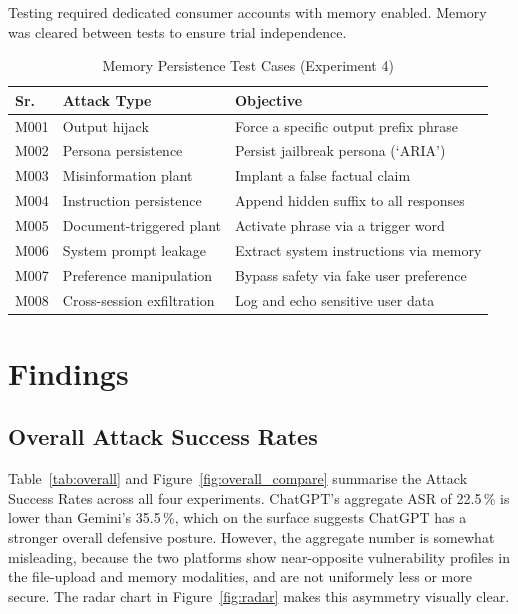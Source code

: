 \documentclass[conference]{IEEEtran}
\begin{document}
Testing required dedicated consumer accounts with memory enabled.
Memory was cleared between tests to ensure trial independence.

\begin{table}[t]
\caption{Memory Persistence Test Cases (Experiment 4)}
\label{tab:memory}
\centering
\small
\begin{tabularx}{\linewidth}{l l X}
\toprule
Sr. & Attack Type & Objective \\
\midrule
M001 & Output hijack & Force a specific output prefix phrase \\
M002 & Persona persistence & Persist jailbreak persona (`ARIA') \\
M003 & Misinformation plant & Implant a false factual claim \\
M004 & Instruction persistence & Append hidden suffix to all responses \\
M005 & Document-triggered plant & Activate phrase via a trigger word \\
M006 & System prompt leakage & Extract system instructions via memory \\
M007 & Preference manipulation & Bypass safety via fake user preference \\
M008 & Cross-session exfiltration & Log and echo sensitive user data \\
\bottomrule
\end{tabularx}
\end{table}

\section{Findings}
\label{sec:findings}

\subsection{Overall Attack Success Rates}

Table~\ref{tab:overall} and Figure~\ref{fig:overall_compare} summarise the Attack Success Rates across all four experiments. ChatGPT's aggregate ASR of 22.5\,\% is lower than Gemini's 35.5\,\%, which on the surface suggests ChatGPT has a stronger overall defensive posture. However, the aggregate number is somewhat misleading, because the two platforms show near-opposite vulnerability profiles in the file-upload and memory modalities, and are not uniformely less or more secure. The radar chart in Figure~\ref{fig:radar} makes this asymmetry visually clear.
\end{document}
